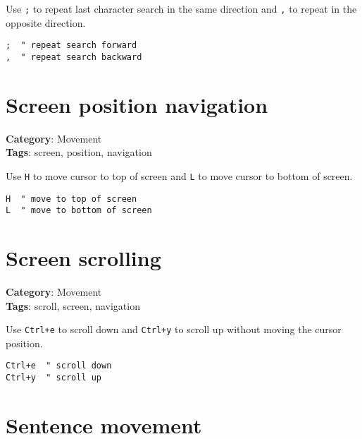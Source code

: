 {{{{{{{{Use {\footnotesize \Verb§;§} to repeat last character search in the same direction and {\footnotesize \Verb§,§} to repeat in the opposite direction.

\begin{Exa*}{}
\begin{Verbatim}[fontsize=\footnotesize, breaklines, breakanywhere]
;  " repeat search forward
,  " repeat search backward
\end{Verbatim}
\end{Exa*}

\section{Screen position navigation}

\textbf{Category}: Movement\\ \textbf{Tags}: screen, position, navigation
\vspace{0.5cm}

Use {\footnotesize \Verb§H§} to move cursor to top of screen and {\footnotesize \Verb§L§} to move cursor to bottom of screen.

\begin{Exa*}{}
\begin{Verbatim}[fontsize=\footnotesize, breaklines, breakanywhere]
H  " move to top of screen
L  " move to bottom of screen
\end{Verbatim}
\end{Exa*}

\section{Screen scrolling}

\textbf{Category}: Movement\\ \textbf{Tags}: scroll, screen, navigation
\vspace{0.5cm}

Use {\footnotesize \Verb§Ctrl+e§} to scroll down and {\footnotesize \Verb§Ctrl+y§} to scroll up without moving the cursor position.

\begin{Exa*}{}
\begin{Verbatim}[fontsize=\footnotesize, breaklines, breakanywhere]
Ctrl+e  " scroll down
Ctrl+y  " scroll up
\end{Verbatim}
\end{Exa*}

\section{Sentence movement}

}}}}}}}}
